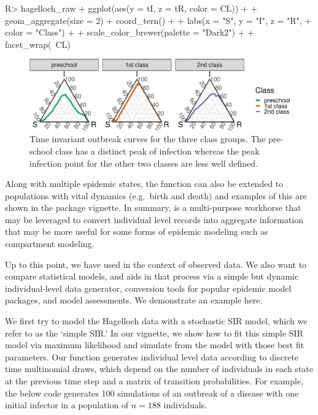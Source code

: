 \documentclass[
  shortnames]{jss}
\begin{document}
\begin{CodeChunk}
\begin{CodeInput}
R> hagelloch_raw %
+   ggplot(aes(y = tI, z = tR, color = CL)) +
+   geom_aggregate(size = 2) + coord_tern() +
+   labs(x = "S", y = "I", z = "R",
+        color = "Class") +
+   scale_color_brewer(palette = "Dark2") +
+   facet_wrap(~CL)
\end{CodeInput}
\begin{figure}[H]

{\centering \includegraphics{Figs/unnamed-chunk-10-1} 

}

\caption{\label{fig:tern-class-data}Time invariant outbreak curves for the three class groups.  The pre-school class has a distinct peak of infection whereas the peak infection point for the other two classes are less well defined.}\label{fig:unnamed-chunk-10}
\end{figure}
\end{CodeChunk}

Along with multiple epidemic states, the function
 can also be extended to populations with
vital dynamics (e.g.~birth and death) and examples of this are shown in
the package vignette. In summary,  is a
multi-purpose workhorse that may be leveraged to convert individual
level records into aggregate information that may be more useful for
some forms of epidemic modeling such as compartment modeling.

Up to this point, we have used  in the context of
observed data. We also want to compare statistical models, and
 aids in that process via a simple but dynamic
individual-level data generator, conversion tools for popular epidemic
model packages, and model assessments. We demonstrate an example here.

We first try to model the Hagelloch data with a stochastic SIR model,
which we refer to as the `simple SIR.' In our vignette, we show how to
fit this simple SIR model via maximum likelihood and simulate from the
model with those best fit parameters. Our function
 generates individual level data according to
discrete time multinomial draws, which depend on the number of
individuals in each state at the previous time step and a matrix of
transition probabilities. For example, the below code generates 100
simulations of an outbreak of a disease with one initial infector in a
population of \(n= 188\) individuals.
\end{document}
